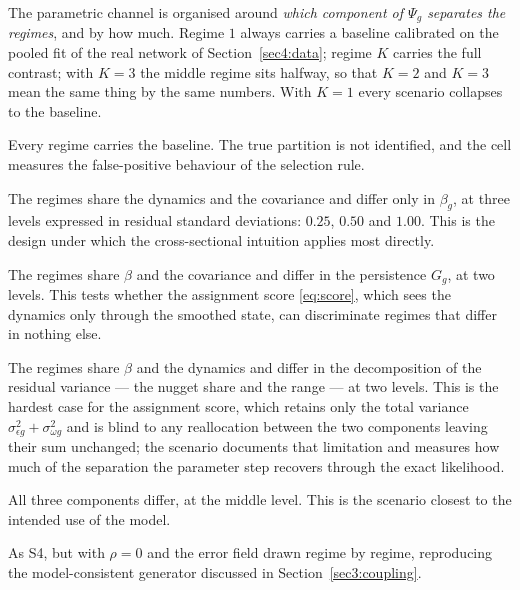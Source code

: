 The parametric channel is organised around \emph{which component of $\Psi_g$ separates the regimes}, and by how much. Regime $1$ always carries a baseline calibrated on the pooled fit of the real network of Section~\ref{sec4:data}; regime $K$ carries the full contrast; with $K=3$ the middle regime sits halfway, so that $K=2$ and $K=3$ mean the same thing by the same numbers. With $K=1$ every scenario collapses to the baseline.

\begin{description}[leftmargin=1.2em,itemsep=3pt,topsep=3pt]
  \item[\textbf{S0 --- no separation.}] Every regime carries the baseline. The true partition is not identified, and the cell measures the false-positive behaviour of the selection rule.
  \item[\textbf{S1 --- separation in the regression coefficients.}] The regimes share the dynamics and the covariance and differ only in $\beta_g$, at three levels expressed in residual standard deviations: $0.25$, $0.50$ and $1.00$. This is the design under which the cross-sectional intuition applies most directly.
  \item[\textbf{S2 --- separation in the latent dynamics.}] The regimes share $\beta$ and the covariance and differ in the persistence $G_g$, at two levels. This tests whether the assignment score \eqref{eq:score}, which sees the dynamics only through the smoothed state, can discriminate regimes that differ in nothing else.
  \item[\textbf{S3 --- separation in the spatial covariance.}] The regimes share $\beta$ and the dynamics and differ in the decomposition of the residual variance --- the nugget share and the range --- at two levels. This is the hardest case for the assignment score, which retains only the total variance $\sigma^2_{\epsilon g} + \sigma^2_{\omega g}$ and is blind to any reallocation between the two components leaving their sum unchanged; the scenario documents that limitation and measures how much of the separation the parameter step recovers through the exact likelihood.
  \item[\textbf{S4 --- joint separation.}] All three components differ, at the middle level. This is the scenario closest to the intended use of the model.
  \item[\textbf{S5 --- reference.}] As S4, but with $\rho = 0$ and the error field drawn regime by regime, reproducing the model-consistent generator discussed in Section~\ref{sec3:coupling}.
\end{description}

